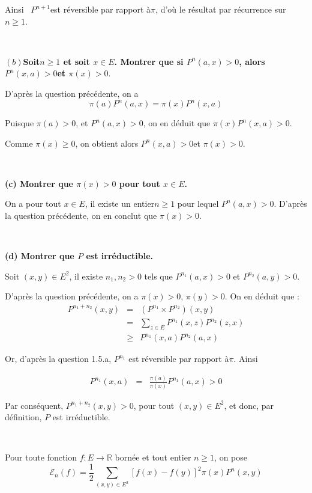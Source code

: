 Ainsi \ $P^{n + 1} $est r{\'e}versible par rapport {\`a}$\pi$, d'o{\`u} le
r{\'e}sultat par r{\'e}currence sur $n \geqslant 1$.

\

\textbf{$(b)$Soit$n \geqslant 1$ et soit $x \in E$. Montrer que si
$P^n (a, x) > 0$, alors $P^n (x, a) > 0$et $\pi (x) > 0.$}

D'apr{\`e}s la question pr{\'e}c{\'e}dente, on a
\[ \pi (a) P^n (a, x) = \pi (x) P^n (x, a) \]


Puisque $\pi (a) > 0$, et $P^n (a, x) > 0$, on en d{\'e}duit que $\pi (x) P^n
(x, a) > 0$.

Comme $\pi (x) \geqslant 0$, on obtient alors $P^n (x, a) > 0$et $\pi (x) >
0.$

\

\textbf{(c) Montrer que $\pi (x) > 0$ pour tout $x \in E$. }

On a pour tout $x \in E$, il existe un entier$n \geqslant 1$ pour lequel $P^n
(a, x) > 0.$ D'apr{\`e}s la question pr{\'e}c{\'e}dente, on en conclut que
$\pi (x) > 0$.

\

\textbf{(d) Montrer que $P$ est irr{\'e}ductible.}

Soit $(x, y) \in E^2$, il existe $n_1, n_2 > 0$ tels que $P^{n_1} (a, x) > 0$
et $P^{n_2} (a, y) > 0$.

D'apr{\`e}s la question pr{\'e}c{\'e}dente, on a $\pi (x) > 0$, $\pi (y) > 0$.
On en d{\'e}duit que :
\begin{eqnarray*}
  P^{n_1 + n_2} (x, y) & = & (P^{n_1} \times P^{n_2}) (x, y)\\
  & = & \underset{z \in E}{\sum} P^{n_1} (x, z) P^{n_2} (z, x)\\
  & \geqslant & P^{n_1} (x, a) P^{n_2} (a, x)
\end{eqnarray*}


Or, d'apr{\`e}s la question 1.5.a, $P^{n_1}$ est r{\'e}versible par rapport
{\`a}$\pi$. Ainsi


\begin{eqnarray*}
  P^{n_1} (x, a) & = & \frac{\pi (a)}{\pi (x)} P^{n_1} (a, x) > 0
\end{eqnarray*}


Par cons{\'e}quent, $P^{n_1 + n_2} (x, y) > 0$, pour tout $(x, y) \in E^2$, et
donc, par d{\'e}finition, $P$ est irr{\'e}ductible.

\

 Pour toute fonction $f : E \rightarrow \mathbb{R}$ born{\'e}e
et tout entier $n \geqslant 1$, on pose
\[ \mathcal{E}_n (f) = \frac{1}{2} \underset{(x, y) \in E^2}{\sum}  [f (x) - f
   (y)]^2 \pi (x) P^n (x, y) \]


